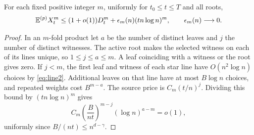\begin{lemma}\label{lem:short}
For each fixed positive integer \(m\), uniformly for \(t_0\le t\le T\)
and all roots,
\begin{equation}\label{eq:shortmoment}
 \mathbb E^{(p)}X_t^m\le(1+o(1))D_t^m+\epsilon_m(n)(tn\log n)^m,
 \qquad \epsilon_m(n)\longrightarrow0.
\end{equation}
\end{lemma}
\begin{proof}
In an \(m\)-fold product let \(a\) be the number of distinct leaves
and \(j\) the number of distinct witnesses. The active root makes
the selected witness on each of its lines unique, so
\(1\le j\le a\le m\). A leaf coinciding with a witness or the root
gives zero. If \(j<m\), the first leaf and witness of each star
line have \(O(n^2\log n)\) choices by \eqref{eq:line2}.
Additional leaves on that line have at most \(B\log n\) choices,
and repeated weights cost \(B^{m-a}\). The source price is
\(C_m(t/n)^j\). Dividing this bound by \((tn\log n)^m\) gives
\[
 C_m\left(\frac B{nt}\right)^{m-j}(\log n)^{a-m}=o(1),
\]
uniformly since \(B/(nt)\le n^{d-\gamma}\).


\end{proof}

